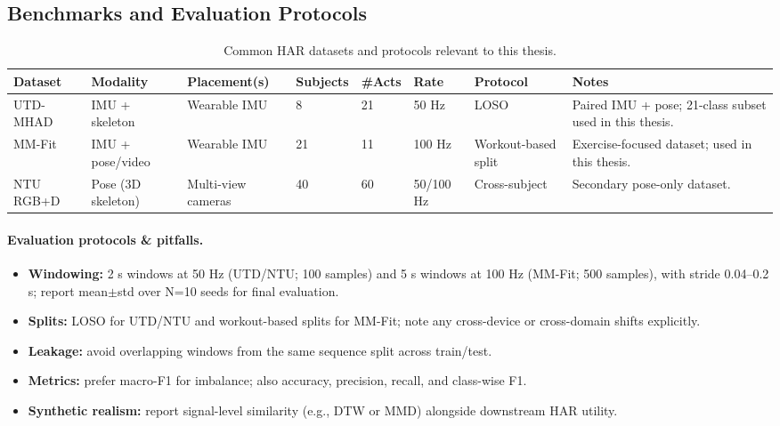 \subsection{Benchmarks and Evaluation Protocols}
\label{subsec:har-benchmarks}
%

\begin{table}[t]
  \centering
  \footnotesize
  \caption{Common HAR datasets and protocols relevant to this thesis.}
  \label{tab:har-datasets}
  \begin{tabular}{l l l l l l l p{3.4cm}}
    \toprule
    \textbf{Dataset} & \textbf{Modality} & \textbf{Placement(s)} & \textbf{Subjects} & \textbf{\#Acts} & \textbf{Rate} & \textbf{Protocol} & \textbf{Notes} \\
    \midrule
    UTD-MHAD & IMU + skeleton & Wearable IMU & 8 & 21 & 50 Hz & LOSO & Paired IMU + pose; 21-class subset used in this thesis. \\
    MM-Fit & IMU + pose/video & Wearable IMU & 21 & 11 & 100 Hz & Workout-based split & Exercise-focused dataset; used in this thesis. \\
    NTU RGB+D & Pose (3D skeleton) & Multi-view cameras & 40 & 60 & 50/100 Hz & Cross-subject & Secondary pose-only dataset. \\
    \bottomrule
  \end{tabular}
\end{table}

\paragraph*{Evaluation protocols \& pitfalls.}
\begin{itemize}[leftmargin=1.2em]
  \item \textbf{Windowing:} 2 s windows at 50 Hz (UTD/NTU; 100 samples) and 5 s windows at 100 Hz (MM-Fit; 500 samples), with stride 0.04--0.2 s; report mean$\pm$std over N=10 seeds for final evaluation.
  \item \textbf{Splits:} LOSO for UTD/NTU and workout-based splits for MM-Fit; note any cross-device or cross-domain shifts explicitly.
  \item \textbf{Leakage:} avoid overlapping windows from the same sequence split across train/test.
  \item \textbf{Metrics:} prefer macro-F1 for imbalance; also accuracy, precision, recall, and class-wise F1.
  \item \textbf{Synthetic realism:} report signal-level similarity (e.g., DTW or MMD) alongside downstream HAR utility.
\end{itemize}


